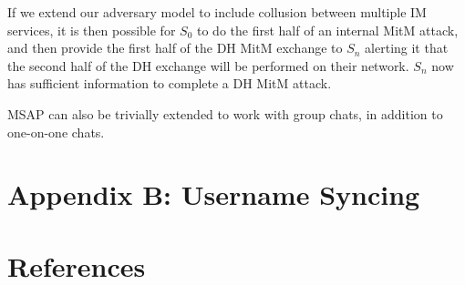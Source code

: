 \documentclass[twoside,10pt]{article}
\begin{document}
\begin{multicols}{2}
If we extend our adversary model to include collusion between multiple IM services, it is then possible for $S_0$ to do the first half of an internal MitM attack, and then provide the first half of the DH MitM exchange to $S_n$ alerting it that the second half of the DH exchange will be performed on their network.  $S_n$ now has sufficient information to complete a DH MitM attack.


MSAP can also be trivially extended to work with group chats, in addition to one-on-one chats.

\section{Appendix B: Username Syncing}

\section{References}




\end{multicols}
\end{document}
